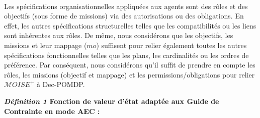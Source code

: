\

\noindent Les spécifications organisationnelles appliquées aux agents sont des rôles et des objectifs (sous forme de missions) via des autorisations ou des obligations. En effet, les autres spécifications structurelles telles que les compatibilités ou les liens sont inhérentes aux rôles. De même, nous considérons que les objectifs, les missions et leur mappage ($mo$) suffisent pour relier également toutes les autres spécifications fonctionnelles telles que les plans, les cardinalités ou les ordres de préférence.
Par conséquent, nous considérons qu'il suffit de prendre en compte les rôles, les missions (objectif et mappage) et les permissions/obligations pour relier $\mathcal{M}OISE^+$ à Dec-POMDP.


\begin{figure*}[t]

    \label{eq:single_value_function}
    \raggedright
    \textbf{\textit{Définition 1} \quad Fonction de valeur d'état adaptée aux \textbf{Guide de Contrainte} en mode AEC :}


\end{figure*}
